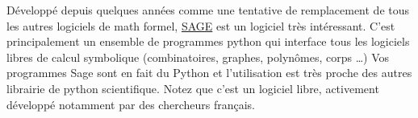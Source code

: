 Développé depuis quelques années comme une tentative de remplacement de tous les
autres logiciels de math formel,  \href{http://www.sagemath.org/}{SAGE} est un logiciel très intéressant.
C'est principalement un ensemble de programmes python qui interface tous les logiciels
libres de calcul symbolique (combinatoires, graphes, polynômes, corps \dots)
Vos programmes Sage sont en fait du Python et l'utilisation est très proche des 
autres librairie de python scientifique.
Notez que c'est un logiciel libre, activement développé notamment par des chercheurs français.



